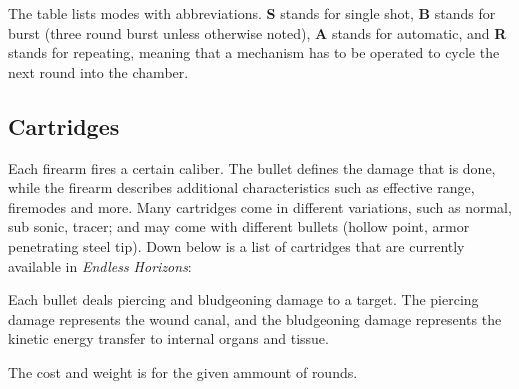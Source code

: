 The table lists modes with abbreviations. \textbf{S} stands for single shot,
\textbf{B} stands for burst (three round burst unless otherwise noted),
\textbf{A} stands for automatic, and \textbf{R} stands for repeating, meaning
that a mechanism has to be operated to cycle the next round into the chamber.

\subsection{Cartridges}
\label{sub:9-Cartridges}

Each firearm fires a certain caliber. The bullet defines the damage that is
done, while the firearm describes additional characteristics such as effective
range, firemodes and more. Many cartridges come in different variations, such as
normal, sub sonic, tracer; and may come with different bullets (hollow point,
armor penetrating steel tip). Down below is a list of cartridges that are
currently available in \emph{Endless Horizons}:

Each bullet deals piercing and bludgeoning damage to a target. The piercing
damage represents the wound canal, and the bludgeoning damage represents the
kinetic energy transfer to internal organs and tissue.

The cost and weight is for the given ammount of rounds.

